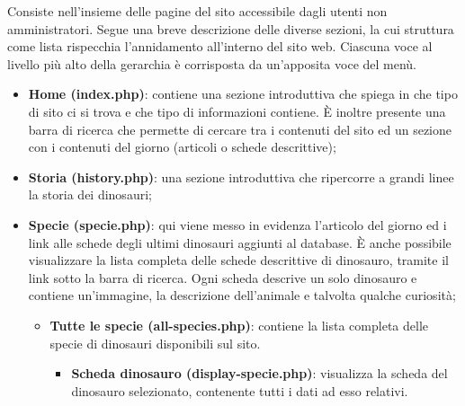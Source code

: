 \documentclass[12pt]{article}
\begin{document}
	Consiste nell'insieme delle pagine del sito accessibile dagli utenti non amministratori. Segue una breve descrizione delle diverse sezioni, la cui struttura come lista rispecchia l'annidamento all'interno del sito web. Ciascuna voce al livello più alto della gerarchia è corrisposta da un'apposita voce del menù.
	\begin{itemize}
		\item \textbf{Home (index.php)}: contiene una sezione introduttiva che spiega in che tipo di sito ci si trova e che tipo di informazioni contiene. È inoltre presente una barra di ricerca che permette di cercare tra i contenuti del sito ed un sezione con i contenuti del giorno (articoli o schede descrittive);
		\item \textbf{Storia (history.php)}: una sezione introduttiva che ripercorre a grandi linee la storia dei dinosauri;
		\item \textbf{Specie (specie.php)}: qui viene messo in evidenza l'articolo del giorno ed i link alle schede degli ultimi dinosauri aggiunti al database. È anche possibile visualizzare la lista completa delle schede descrittive di dinosauro, tramite il link sotto la barra di ricerca. Ogni scheda descrive un solo dinosauro e contiene un'immagine, la descrizione dell'animale e talvolta qualche curiosità;
			\begin{itemize}
				\item \textbf{Tutte le specie (all-species.php)}: contiene la lista completa delle specie di dinosauri disponibili sul sito.
				\begin{itemize}
					\item \textbf{Scheda dinosauro (display-specie.php)}: visualizza la scheda del dinosauro selezionato, contenente tutti i dati ad esso relativi.
				\end{itemize}
			\end{itemize}
			

\end{itemize}
\end{document}
